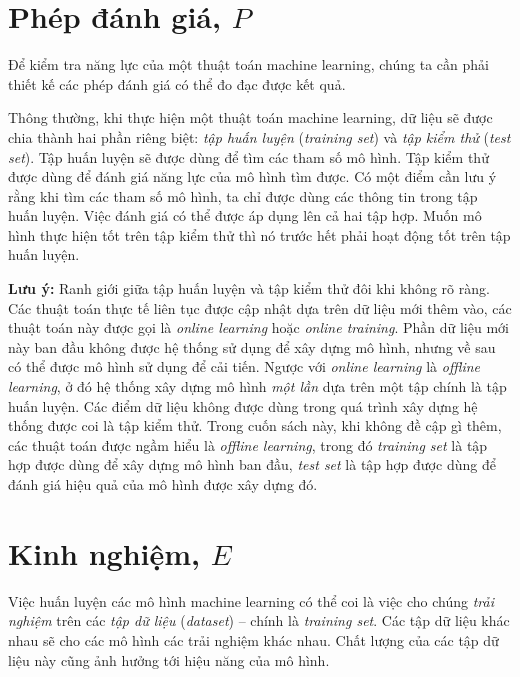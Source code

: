 \section{Phép đánh giá, $P$}


Để kiểm tra năng lực của một thuật toán machine learning, chúng ta cần phải
thiết kế các phép đánh giá có thể đo đạc được kết quả. 

Thông thường, khi thực hiện một thuật toán machine learning, dữ liệu sẽ được
chia thành hai phần riêng biệt: \textit{tập huấn luyện} (\textit{training set})
và \textit{tập kiểm thử} (\textit{test set}). Tập huấn luyện sẽ được dùng để tìm
các tham số mô hình. Tập kiểm thử được dùng để đánh giá năng lực của mô hình tìm
được. Có một điểm cần lưu ý rằng khi tìm các tham số mô hình, ta chỉ được dùng
các thông tin trong tập huấn luyện. Việc đánh giá có thể được áp dụng lên cả
hai tập hợp. Muốn mô hình thực hiện tốt trên tập kiểm thử thì nó trước hết phải
hoạt động tốt trên tập huấn luyện. 

\textbf{Lưu ý:} Ranh giới giữa tập huấn luyện và tập kiểm thử đôi khi không rõ
ràng. Các thuật toán thực tế liên tục được cập nhật dựa trên dữ liệu mới thêm
vào, các thuật toán này được gọi là \textit{online learning} hoặc \textit{online
training}. Phần dữ liệu mới này ban đầu không được hệ thống sử dụng để xây
dựng mô hình, nhưng về sau có thể được mô hình sử dụng để cải tiến. Ngược với
\textit{online learning} là \textit{offline learning}, ở đó hệ thống xây dựng mô
hình \textit{một lần} dựa trên một tập chính là tập huấn luyện. Các điểm dữ
liệu không được dùng trong quá trình xây dựng hệ thống được coi là tập kiểm thử.
Trong cuốn sách này, khi không đề cập gì thêm, các thuật toán được ngầm hiểu là
\textit{offline
learning}, trong đó \textit{training set} là tập hợp được dùng để xây dựng mô
hình ban
đầu, \textit{test set} là tập hợp được dùng để đánh giá hiệu quả của mô hình
được xây dựng đó.

\section{Kinh nghiệm, $E$}



Việc huấn luyện các mô hình machine learning có thể coi là việc cho chúng
\textit{trải nghiệm} trên các \textit{tập dữ liệu} (\textit{dataset}) -- chính là
\textit{training set}. Các tập dữ liệu khác nhau sẽ cho các mô hình các trải
nghiệm khác nhau. Chất lượng của
các tập dữ liệu này cũng ảnh hưởng tới hiệu năng của mô hình. 

